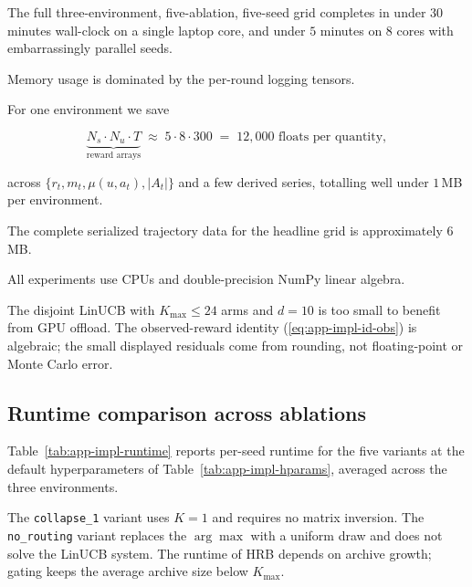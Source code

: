 \documentclass{article} %
\renewcommand{\eqref}[1]{\textup{(\ref{#1})}}
\begin{document}
The full three-environment, five-ablation, five-seed grid completes in under $30$ minutes wall-clock on a single laptop core, and under $5$ minutes on $8$ cores with embarrassingly parallel seeds.

Memory usage is dominated by the per-round logging tensors.

For one environment we save

\begin{equation}
\label{eq:app-impl-storage}
\underbrace{N_s \cdot N_u \cdot T}_{\text{reward arrays}} \;\approx\; 5 \cdot 8 \cdot 300 \;=\; 12{,}000 \text{ floats per quantity},
\end{equation}

across $\{r_t, m_t, \mu(u,a_t), |A_t|\}$ and a few derived series, totalling well under $1$\,MB per environment.

The complete serialized trajectory data for the headline grid is approximately \(6\) MB.

All experiments use CPUs and double-precision NumPy linear algebra.

The disjoint LinUCB with \(K_{\max}\le24\) arms and \(d=10\) is too small to
benefit from GPU offload. The observed-reward identity
\eqref{eq:app-impl-id-obs} is algebraic; the small displayed residuals come
from rounding, not floating-point or Monte Carlo error.

\subsection{Runtime comparison across ablations}

\label{app:impl-runtime}

Table~\ref{tab:app-impl-runtime} reports per-seed runtime for the five variants at the default hyperparameters of Table~\ref{tab:app-impl-hparams}, averaged across the three environments.

The \texttt{collapse\_1} variant uses $K=1$ and requires no matrix inversion.
The \texttt{no\_routing} variant replaces the $\arg\max$ with a uniform draw
and does not solve the LinUCB system. The runtime of \textnormal{HRB} depends on
archive growth; gating keeps the average archive size below $K_{\max}$.
\end{document}
